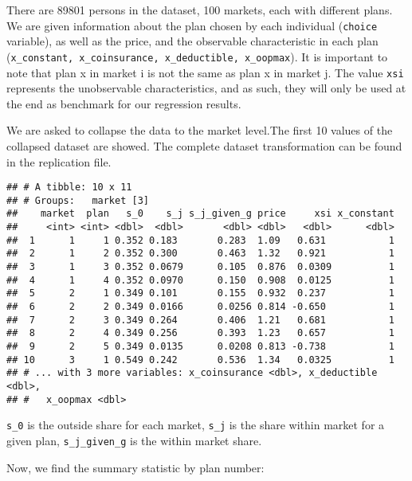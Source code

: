 \documentclass[]{article}
\begin{document}
There are 89801 persons in the dataset, 100 markets, each with different
plans. We are given information about the plan chosen by each individual
(\texttt{choice} variable), as well as the price, and the observable
characteristic in each plan
(\texttt{x\_constant,\ x\_coinsurance,\ x\_deductible,\ x\_oopmax}). It
is important to note that plan x in market i is not the same as plan x
in market j. The value \texttt{xsi} represents the unobservable
characteristics, and as such, they will only be used at the end as
benchmark for our regression results.

We are asked to collapse the data to the market level.The first 10
values of the collapsed dataset are showed. The complete dataset
transformation can be found in the replication file.

\begin{verbatim}
## # A tibble: 10 x 11
## # Groups:   market [3]
##    market  plan   s_0    s_j s_j_given_g price     xsi x_constant
##     <int> <int> <dbl>  <dbl>       <dbl> <dbl>   <dbl>      <dbl>
##  1      1     1 0.352 0.183       0.283  1.09   0.631           1
##  2      1     2 0.352 0.300       0.463  1.32   0.921           1
##  3      1     3 0.352 0.0679      0.105  0.876  0.0309          1
##  4      1     4 0.352 0.0970      0.150  0.908  0.0125          1
##  5      2     1 0.349 0.101       0.155  0.932  0.237           1
##  6      2     2 0.349 0.0166      0.0256 0.814 -0.650           1
##  7      2     3 0.349 0.264       0.406  1.21   0.681           1
##  8      2     4 0.349 0.256       0.393  1.23   0.657           1
##  9      2     5 0.349 0.0135      0.0208 0.813 -0.738           1
## 10      3     1 0.549 0.242       0.536  1.34   0.0325          1
## # ... with 3 more variables: x_coinsurance <dbl>, x_deductible <dbl>,
## #   x_oopmax <dbl>
\end{verbatim}

\texttt{s\_0} is the outside share for each market, \texttt{s\_j} is the
share within market for a given plan, \texttt{s\_j\_given\_g} is the
within market share.

Now, we find the summary statistic by plan number:
\end{document}
